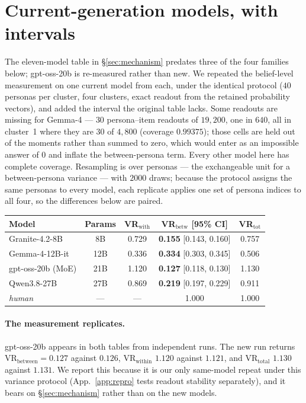\documentclass[11pt]{article}
\begin{document}
\section{Current-generation models, with intervals}
\label{app:current}

The eleven-model table in \S\ref{sec:mechanism} predates three of the four
families below; gpt-oss-20b is re-measured rather than new. We repeated the belief-level measurement on one current model
from each, under the identical protocol ($40$ personas per cluster, four
clusters, exact readout from the retained probability vectors), and added the
interval the original table lacks. Some readouts are missing for
Gemma-4 --- $30$ persona--item readouts of $19{,}200$, one in $640$, all in
cluster~1 where they are $30$ of $4{,}800$ (coverage $0.99375$); those cells
are held out of the moments rather than summed to zero, which would enter as an
impossible answer of $0$ and inflate the between-persona term. Every other model
here has complete coverage. Resampling is over personas --- the
exchangeable unit for a between-persona variance --- with $2000$ draws; because
the protocol assigns the same personas to every model, each replicate applies
one set of persona indices to all four, so the differences below are paired.

\begin{center}\scriptsize
\setlength{\tabcolsep}{2.5pt}
\begin{tabular}{lcccc}
\toprule
Model & Params & VR$_\text{with}$ & VR$_\text{betw}$ [95\% CI] & VR$_\text{tot}$\\
\midrule
Granite-4.2-8B & 8B & 0.729 & \textbf{0.155} [0.143, 0.160] & 0.757\\
Gemma-4-12B-it & 12B & 0.336 & \textbf{0.334} [0.303, 0.345] & 0.506\\
gpt-oss-20b (MoE) & 21B & 1.120 & \textbf{0.127} [0.118, 0.130] & 1.130\\
Qwen3.8-27B & 27B & 0.869 & \textbf{0.219} [0.197, 0.229] & 0.911\\
\midrule
\textit{human} & --- & --- & 1.000 & 1.000\\
\bottomrule
\end{tabular}
\end{center}

\paragraph{The measurement replicates.} gpt-oss-20b appears in both tables from
independent runs. The new run returns $\mathrm{VR}_\text{between}=0.127$ against
$0.126$, $\mathrm{VR}_\text{within}$ $1.120$ against $1.121$, and
$\mathrm{VR}_\text{total}$ $1.130$ against $1.131$. We report this because it is
our only same-model repeat under this variance protocol (App.~\ref{app:repro}
tests readout stability separately), and it bears on \S\ref{sec:mechanism}
rather than on the new models.
\end{document}
